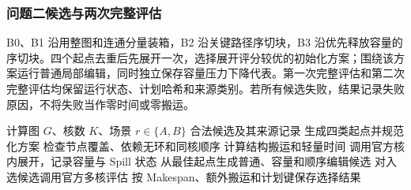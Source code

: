 \subsubsection{问题二候选与两次完整评估}
B0、B1 沿用整图和连通分量装箱，B2 沿关键路径序切块，B3 沿优先释放容量的序切块。四个起点去重后先展开一次，选择展开评分较优的初始化方案；围绕该方案运行普通局部编辑，同时独立保存容量压力下降代表。第一次完整评估和第二次完整评估均保留运行状态、计划哈希和来源类别。若所有候选失败，结果记录失败原因，不将失败当作零时间或零搬运。

\begin{algorithm}[H]\caption{问题一、二的候选生成与选择}\begin{algorithmic}[1]
\REQUIRE 计算图 $G$、核数 $K$、场景 $r\in\{A,B\}$
\ENSURE 合法候选及其来源记录
\STATE 生成四类起点并规范化方案
\STATE 检查节点覆盖、依赖无环和同核顺序
\STATE 计算结构搬运和轻量时间
\STATE 调用官方核内展开，记录容量与 Spill 状态
\ENDFOR
\STATE 从最佳起点生成普通、容量和顺序编辑候选
\STATE 对入选候选调用官方多核评估
\STATE 按 Makespan、额外搬运和计划键保存选择结果
\end{algorithmic}\end{algorithm}
